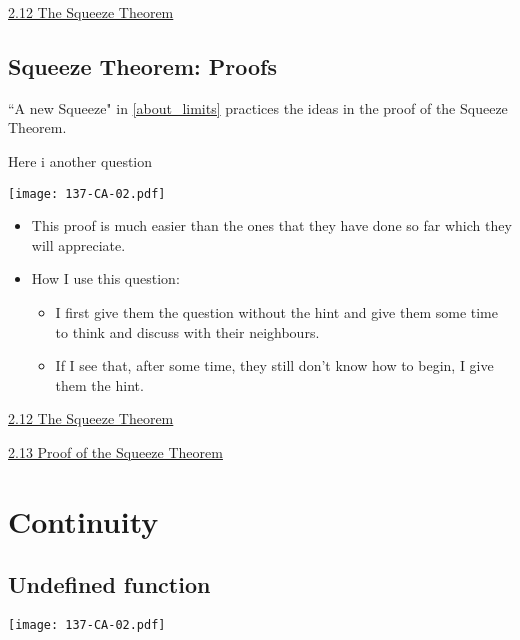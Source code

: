 \documentclass[11pt]{article}
\newcommand{\n}{\newpage}
\newcommand{\nl}{\hfill \vspace{-1.1\baselineskip}} %
\newcommand{\vxii}{\hspace{8mm} \href{https://www.youtube.com/watch?v=7TGgWs_qCWY&list=PLlwePzQY_wW8P_I8BFgm0-upywEwTKd8_&index=12}{2.12 The Squeeze Theorem}}
\newcommand{\vxiii}{\hspace{8mm} \href{https://www.youtube.com/watch?v=vTonfq94c8s&list=PLlwePzQY_wW8P_I8BFgm0-upywEwTKd8_&index=13}{2.13 Proof of the Squeeze Theorem}}
\begin{document}
\begin{videos}
\vxii
\end{videos}

\n
\subsection{Squeeze Theorem: Proofs}

``A new Squeeze" in \autoref{about_limits} practices the ideas in the proof of the Squeeze Theorem.

Here i another question

\begin{center}
{ \texttt{[image: 137-CA-02.pdf]}}
\end{center}

\begin{comments}
\nl
	\begin{itemize}
	\item This proof is much easier than the ones that they have done so far which they will appreciate.
	\item How I use this question:
		\begin{itemize}
		\item I first give them the question without the hint and give them some time to think and discuss with their neighbours.
		\item If I see that, after some time, they still don't know how to begin, I give them the hint. 
		\end{itemize}
	\end{itemize}

\end{comments}

\begin{videos}
\vxii 

\vxiii
\end{videos}


\newpage
\section{Continuity}
\subsection{Undefined function} 

\begin{center}
{ \texttt{[image: 137-CA-02.pdf]}}
\end{center}
\end{document}
